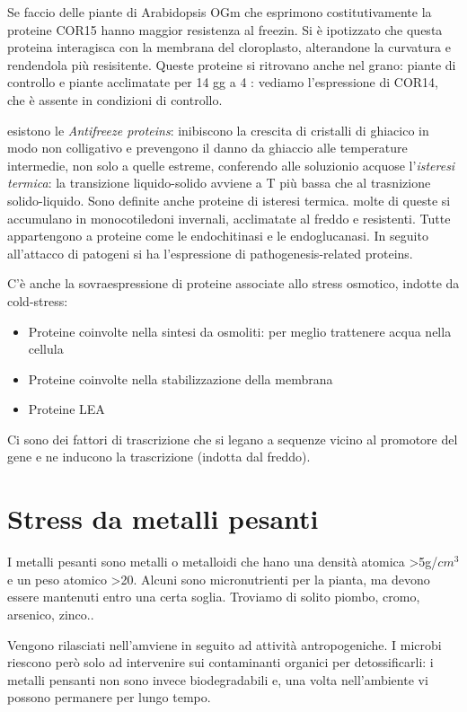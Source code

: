 \documentclass[a4paper,12pt]{book}
\begin{document}
Se faccio delle piante di Arabidopsis OGm che esprimono costitutivamente la proteine COR15 hanno maggior resistenza al freezin. Si è ipotizzato che questa proteina interagisca con la membrana del cloroplasto, alterandone la curvatura e rendendola più resisitente. Queste proteine si ritrovano anche nel grano: piante di controllo e piante acclimatate per 14 gg a 4 \textcelsius: vediamo l'espressione di COR14, che è assente in condizioni di controllo.

esistono le \emph{Antifreeze proteins}: inibiscono la crescita di cristalli di ghiacico in modo non colligativo  e prevengono il danno da ghiaccio alle temperature intermedie, non solo a quelle estreme, conferendo alle soluzionio acquose l'\emph{isteresi termica}: la transizione liquido-solido avviene a T più bassa che al trasnizione solido-liquido. Sono definite anche proteine di isteresi termica. molte di queste si accumulano in monocotiledoni invernali, acclimatate al freddo e resistenti. Tutte appartengono a proteine come le endochitinasi e le endoglucanasi. In seguito all'attacco di patogeni si ha l'espressione di pathogenesis-related proteins.

C'è anche la sovraespressione di proteine associate allo stress osmotico, indotte da cold-stress:
\begin{itemize}
\item{Proteine coinvolte nella sintesi da osmoliti: per meglio trattenere acqua nella cellula}
\item{Proteine coinvolte nella stabilizzazione della membrana}
 \item{Proteine LEA}
\end{itemize}

Ci sono dei fattori di trascrizione che si legano a sequenze vicino al promotore del gene e ne inducono la trascrizione (indotta dal freddo).

\chapter{Stress da metalli pesanti}
I metalli pesanti sono metalli o metalloidi che hano una densità atomica >5g/$cm^{3}$ e un peso atomico >20. Alcuni sono micronutrienti per la pianta, ma devono essere mantenuti entro una certa soglia. Troviamo di solito piombo, cromo, arsenico, zinco..

Vengono rilasciati nell'amviene in seguito ad attività antropogeniche. I microbi riescono però solo ad intervenire sui contaminanti organici per detossificarli: i metalli pensanti non sono invece biodegradabili e, una volta nell'ambiente vi possono permanere per lungo tempo.
\end{document}
